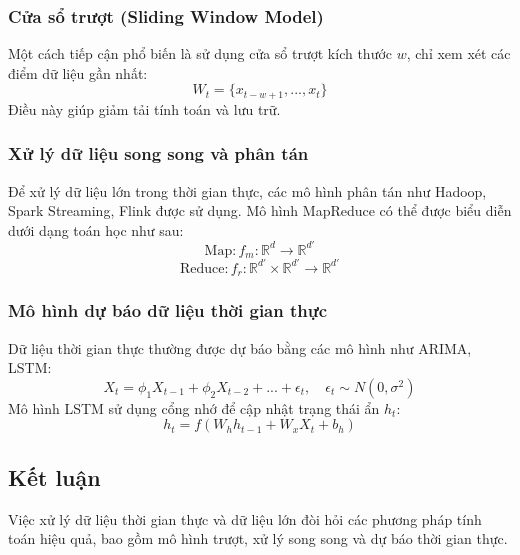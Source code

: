 \subsubsection{Cửa sổ trượt (Sliding Window Model)}
Một cách tiếp cận phổ biến là sử dụng cửa sổ trượt kích thước $w$, chỉ xem xét các điểm dữ liệu gần nhất:
\begin{equation}
    W_t = \{x_{t-w+1}, ..., x_t\}
\end{equation}
Điều này giúp giảm tải tính toán và lưu trữ.

\subsubsection{Xử lý dữ liệu song song và phân tán}
Để xử lý dữ liệu lớn trong thời gian thực, các mô hình phân tán như Hadoop, Spark Streaming, Flink được sử dụng. Mô hình MapReduce có thể được biểu diễn dưới dạng toán học như sau:
\begin{equation}
    \text{Map}: f_m: \mathbb{R}^d \to \mathbb{R}^{d'}
\end{equation}
\begin{equation}
    \text{Reduce}: f_r: \mathbb{R}^{d'} \times \mathbb{R}^{d'} \to \mathbb{R}^{d'}
\end{equation}
\subsubsection{Mô hình dự báo dữ liệu thời gian thực}
Dữ liệu thời gian thực thường được dự báo bằng các mô hình như ARIMA, LSTM:
\begin{equation}
    X_t = \phi_1 X_{t-1} + \phi_2 X_{t-2} + ... + \epsilon_t, \quad \epsilon_t \sim N(0, \sigma^2)
\end{equation}
Mô hình LSTM sử dụng cổng nhớ để cập nhật trạng thái ẩn $h_t$:
\begin{equation}
    h_t = f(W_h h_{t-1} + W_x X_t + b_h)
\end{equation}

\subsection{Kết luận}
Việc xử lý dữ liệu thời gian thực và dữ liệu lớn đòi hỏi các phương pháp tính toán hiệu quả, bao gồm mô hình trượt, xử lý song song và dự báo thời gian thực.
